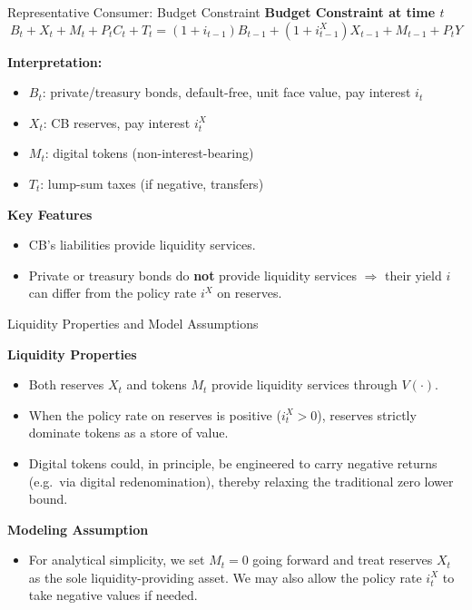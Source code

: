 \documentclass[11pt,aspectratio=169]{beamer}
\begin{document}
\begin{frame}{Representative Consumer: Budget Constraint}
\small
\textbf{Budget Constraint at time $t$}
\begin{equation}
B_t + X_t + M_t + P_t C_t + T_t
= (1+i_{t-1})B_{t-1} + (1+i_{t-1}^{X})X_{t-1} + M_{t-1} + P_t Y
\label{eq:budget_cbdc}
\end{equation}

\textbf{Interpretation:}
\begin{itemize}
  \item $B_t$: private/treasury bonds, default-free, unit face value, pay interest $i_{t}$
  \item $X_t$: CB reserves, pay interest $i_{t}^{X}$
  \item $M_t$: digital tokens (non-interest-bearing)
  \item $T_t$: lump-sum taxes (if negative, transfers)
\end{itemize}

\textbf{Key Features}
\begin{itemize}
 \item CB's liabilities provide liquidity services.
  \item Private or treasury bonds do \textbf{not} provide liquidity services $\Longrightarrow$ their yield $i$ can differ from the policy rate $i^X$ on reserves.
 \end{itemize}
\end{frame}
\begin{frame}{Liquidity Properties and Model Assumptions}
\small

\textbf{Liquidity Properties}
\begin{itemize}
  \item Both reserves $X_t$ and tokens $M_t$ provide liquidity services through $V(\cdot)$.
  \item When the policy rate on reserves is positive ($i_t^X>0$), reserves strictly dominate tokens as a store of value.
  \item Digital tokens could, in principle, be engineered to carry negative returns 
        (e.g.\ via digital redenomination), thereby relaxing the traditional zero lower bound.
\end{itemize}

\textbf{Modeling Assumption}
\begin{itemize}
  \item For analytical simplicity, we set $M_t=0$ going forward and treat reserves $X_t$ as the sole 
        liquidity-providing asset. We may also allow the policy rate $i_t^X$ to take negative values if needed.
\end{itemize}

\end{frame}
\end{document}
